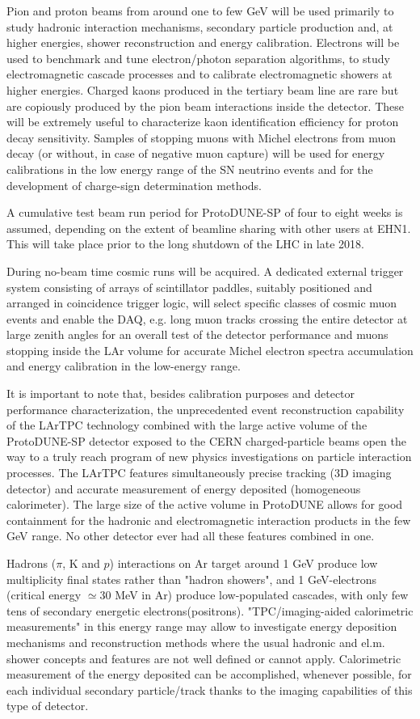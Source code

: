 \documentclass[11pt, oneside]{article}   	%
\begin{document}
Pion and proton beams from around one to few GeV will be used primarily to study hadronic interaction mechanisms, secondary particle production and, at higher energies, shower reconstruction and energy calibration. Electrons will be used to benchmark and tune electron/photon separation algorithms, to study electromagnetic cascade processes and to calibrate electromagnetic showers at higher energies. Charged kaons produced in the tertiary beam line are rare but are copiously produced by the pion beam interactions inside the detector. These will be extremely useful to characterize kaon identification efficiency for proton decay sensitivity.  Samples of stopping muons with Michel electrons from muon decay (or without, in case of negative muon capture) will be used for energy calibrations in the low energy range of the SN neutrino events and for the development of charge-sign determination methods. 

A cumulative test beam run period for ProtoDUNE-SP of four to eight weeks is assumed, depending on the extent of beamline sharing with other users at EHN1. This will take place prior to the long shutdown of the LHC in late 2018. 

During no-beam time cosmic runs will be acquired. A dedicated external trigger system consisting of arrays of scintillator paddles, suitably positioned and arranged in coincidence trigger logic, will select specific classes of cosmic muon events and enable the DAQ, e.g. long muon tracks crossing the entire detector at large zenith angles for an overall test of the detector performance and muons stopping inside the LAr volume for accurate Michel electron spectra accumulation and energy calibration in the low-energy range.

It is important to note that, besides calibration purposes and detector performance characterization, the unprecedented event reconstruction capability of the LArTPC technology combined with the large active volume of the ProtoDUNE-SP detector exposed to the CERN charged-particle beams open the way to a truly reach program of new physics investigations on particle interaction processes. 
  The LArTPC features simultaneously precise tracking (3D imaging detector) and accurate measurement of energy deposited (homogeneous calorimeter). The large size of the active volume in ProtoDUNE allows for good containment for the hadronic and electromagnetic interaction products in the few GeV range. No other detector ever had all these features combined in one. 
 
 Hadrons ($\pi$, K and $p$) interactions on Ar target around 1 GeV produce low multiplicity final states rather than "hadron showers", 
 and 1 GeV-electrons  (critical energy $\simeq 30$ MeV in Ar) produce low-populated cascades, with only few tens of secondary energetic electrons(positrons). 
"TPC/imaging-aided calorimetric measurements" in this energy range may allow to investigate 
energy deposition mechanisms and reconstruction methods where the usual hadronic and el.m. shower concepts and features are not well defined or cannot apply.
Calorimetric measurement of the energy deposited can be accomplished,  whenever possible, for each individual secondary particle/track thanks to the imaging capabilities of this type of detector.
\end{document}
